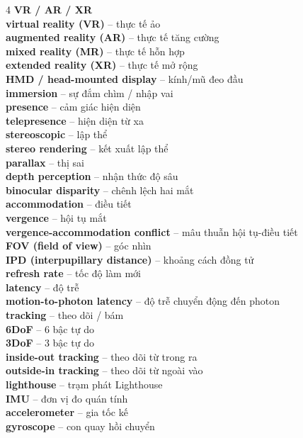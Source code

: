 \begin{multicols}{4}
\textbf{VR / AR / XR}\\
\textbf{virtual reality (VR)} -- thực tế ảo\\
\textbf{augmented reality (AR)} -- thực tế tăng cường\\
\textbf{mixed reality (MR)} -- thực tế hỗn hợp\\
\textbf{extended reality (XR)} -- thực tế mở rộng\\
\textbf{HMD / head-mounted display} -- kính/mũ đeo đầu\\
\textbf{immersion} -- sự đắm chìm / nhập vai\\
\textbf{presence} -- cảm giác hiện diện\\
\textbf{telepresence} -- hiện diện từ xa\\
\textbf{stereoscopic} -- lập thể\\
\textbf{stereo rendering} -- kết xuất lập thể\\
\textbf{parallax} -- thị sai\\
\textbf{depth perception} -- nhận thức độ sâu\\
\textbf{binocular disparity} -- chênh lệch hai mắt\\
\textbf{accommodation} -- điều tiết\\
\textbf{vergence} -- hội tụ mắt\\
\textbf{vergence-accommodation conflict} -- mâu thuẫn hội tụ-điều tiết\\
\textbf{FOV (field of view)} -- góc nhìn\\
\textbf{IPD (interpupillary distance)} -- khoảng cách đồng tử\\
\textbf{refresh rate} -- tốc độ làm mới\\
\textbf{latency} -- độ trễ\\
\textbf{motion-to-photon latency} -- độ trễ chuyển động đến photon\\
\textbf{tracking} -- theo dõi / bám\\
\textbf{6DoF} -- 6 bậc tự do\\
\textbf{3DoF} -- 3 bậc tự do\\
\textbf{inside-out tracking} -- theo dõi từ trong ra\\
\textbf{outside-in tracking} -- theo dõi từ ngoài vào\\
\textbf{lighthouse} -- trạm phát Lighthouse\\
\textbf{IMU} -- đơn vị đo quán tính\\
\textbf{accelerometer} -- gia tốc kế\\
\textbf{gyroscope} -- con quay hồi chuyển\\

\end{multicols}
